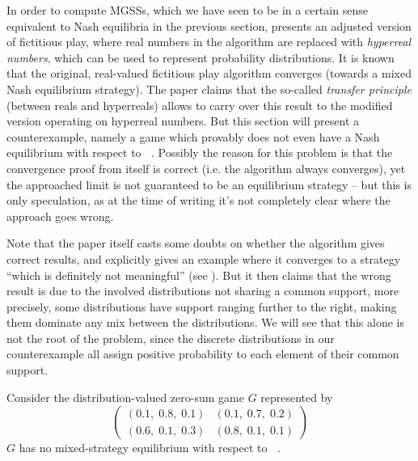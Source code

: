 \documentclass[a4paper]{scrreprt}
\DeclareMathOperator{\leqtail}{\leq_{\text{tail}}}
\begin{document}
    In order to compute MGSSs, which we have seen to be in a certain sense equivalent to Nash equilibria in the previous section, \cite{bib:rassGameRiskManagII} presents an adjusted version of fictitious play, where real numbers in the algorithm are replaced with \emph{hyperreal numbers}, which can be used to represent probability distributions. It is known that the original, real-valued fictitious play algorithm converges (towards a mixed Nash equilibrium strategy).
    The paper claims that the so-called \emph{transfer principle} (between reals and hyperreals) allows to carry over this result to the modified version operating on hyperreal numbers. But this section will present a counterexample, namely a game which provably does not even have a Nash equilibrium with respect to $\leqtail$. Possibly the reason for this problem is that the convergence proof from \cite{bib:rassGameRiskManagII} itself is correct (i.e. the algorithm always converges), yet the approached limit is not guaranteed to be an equilibrium strategy -- but this is only speculation, as at the time of writing it's not completely clear where the approach goes wrong.
    
    Note that the paper itself casts some doubts on whether the algorithm gives correct results, and explicitly gives an example where it converges to a strategy “which is definitely not meaningful”
    (see \cite[p.15]{bib:rassGameRiskManagII}). But it then claims that the wrong result is due to the involved distributions not sharing a common support, more precisely, some distributions have support ranging further to the right, making them dominate any mix between the distributions. We will see that this alone is not the root of the problem, since the discrete distributions in our counterexample all assign positive probability to each element of their common support.
    
    \begin{ex}
        Consider the distribution-valued zero-sum game $G$ represented by
        \begin{equation}
            \begin{pmatrix}
                (0.1,\; 0.8,\; 0.1) & (0.1,\; 0.7,\; 0.2) \\
                (0.6,\; 0.1,\; 0.3) & (0.8,\; 0.1,\; 0.1)
            \end{pmatrix}
        \end{equation}
        $G$ has no mixed-strategy equilibrium with respect to $\leqtail$.
    \end{ex}
    
\end{document}
